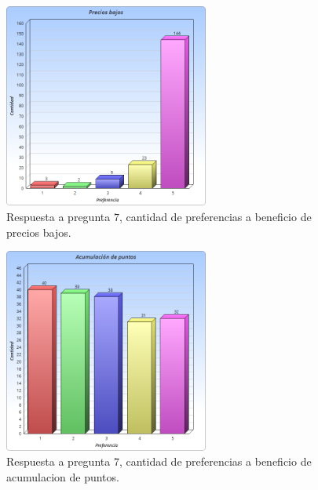 \begin{figure}[!htb]
  \centering
  \includegraphics[width=0.6\textwidth]{images/Graficos/graf_5_5.png}
  \caption[chart5.5]{Respuesta a pregunta $7$, cantidad de preferencias a beneficio de precios bajos.}
  \label{fig:chart5.5}
\end{figure}

\begin{figure}[!htb]
  \centering
  \includegraphics[width=0.6\textwidth]{images/Graficos/graf_5_6.png}
  \caption[chart5.6]{Respuesta a pregunta $7$, cantidad de preferencias a beneficio de acumulacion de puntos.}
  \label{fig:chart5.6}
\end{figure}

